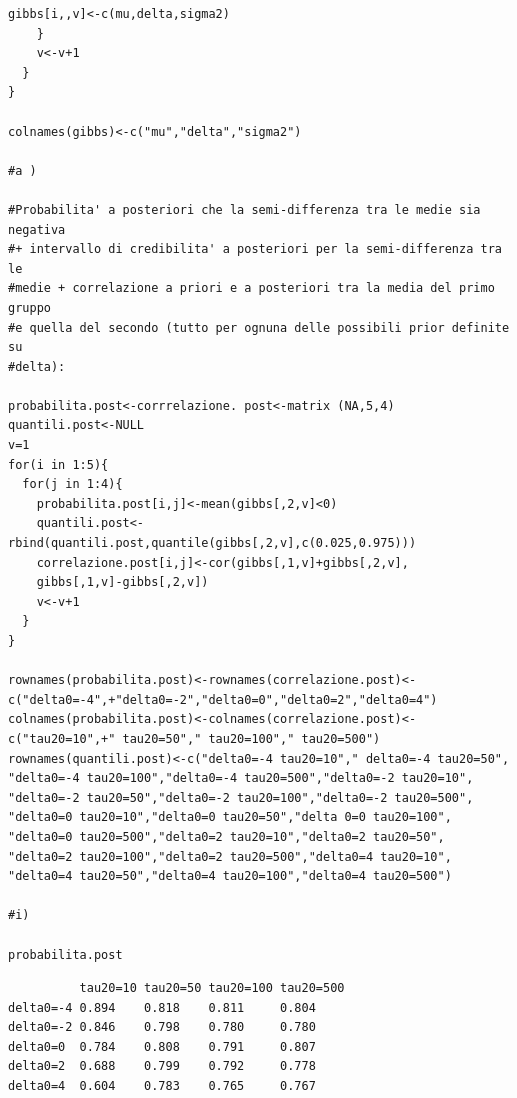\begin{itemize}
\begin{lstlisting}[style=R]
      gibbs[i,,v]<-c(mu,delta,sigma2)
    }
    v<-v+1
  }
}

colnames(gibbs)<-c("mu","delta","sigma2")

#a )

#Probabilita' a posteriori che la semi-differenza tra le medie sia negativa
#+ intervallo di credibilita' a posteriori per la semi-differenza tra le
#medie + correlazione a priori e a posteriori tra la media del primo gruppo
#e quella del secondo (tutto per ognuna delle possibili prior definite su
#delta):

probabilita.post<-corrrelazione. post<-matrix (NA,5,4)
quantili.post<-NULL
v=1
for(i in 1:5){
  for(j in 1:4){
    probabilita.post[i,j]<-mean(gibbs[,2,v]<0)
    quantili.post<-rbind(quantili.post,quantile(gibbs[,2,v],c(0.025,0.975)))
    correlazione.post[i,j]<-cor(gibbs[,1,v]+gibbs[,2,v],
    gibbs[,1,v]-gibbs[,2,v])
    v<-v+1
  }
}

rownames(probabilita.post)<-rownames(correlazione.post)<-
c("delta0=-4",+"delta0=-2","delta0=0","delta0=2","delta0=4")
colnames(probabilita.post)<-colnames(correlazione.post)<-
c("tau20=10",+" tau20=50"," tau20=100"," tau20=500")
rownames(quantili.post)<-c("delta0=-4 tau20=10"," delta0=-4 tau20=50",
"delta0=-4 tau20=100","delta0=-4 tau20=500","delta0=-2 tau20=10",
"delta0=-2 tau20=50","delta0=-2 tau20=100","delta0=-2 tau20=500",
"delta0=0 tau20=10","delta0=0 tau20=50","delta 0=0 tau20=100",
"delta0=0 tau20=500","delta0=2 tau20=10","delta0=2 tau20=50",
"delta0=2 tau20=100","delta0=2 tau20=500","delta0=4 tau20=10",
"delta0=4 tau20=50","delta0=4 tau20=100","delta0=4 tau20=500")

#i)

probabilita.post
\end{lstlisting}

{
\color{red}
\begin{Verbatim}
          tau20=10 tau20=50 tau20=100 tau20=500
delta0=-4 0.894    0.818    0.811     0.804
delta0=-2 0.846    0.798    0.780     0.780
delta0=0  0.784    0.808    0.791     0.807
delta0=2  0.688    0.799    0.792     0.778
delta0=4  0.604    0.783    0.765     0.767
\end{Verbatim}
}


\end{itemize}
